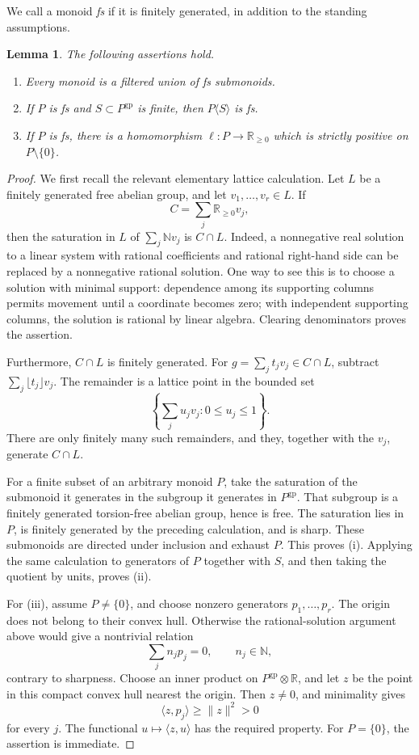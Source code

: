 \documentclass[11pt]{article}
\newtheorem{lemma}[theorem]{Lemma}
\theoremstyle{definition}
\theoremstyle{remark}
\newcommand{\gp}{\mathrm{gp}}
\newcommand{\NN}{\mathbb N}
\newcommand{\RR}{\mathbb R}
\begin{document}
We call a monoid \emph{fs} if it is finitely generated, in addition
to the standing assumptions.

\begin{lemma}\label{lem:fs}
The following assertions hold.
\begin{enumerate}[label=\textup{(\roman*)}]
\item Every monoid is a filtered union of fs submonoids.
\item If \(P\) is fs and \(S\subset P^{\gp}\) is finite, then
\(P\langle S\rangle\) is fs.
\item If \(P\) is fs, there is a homomorphism
\(\ell:P\to\RR_{\ge0}\) which is strictly positive on
\(P\setminus\{0\}\).
\end{enumerate}
\end{lemma}

\begin{proof}
We first recall the relevant elementary lattice calculation.
Let \(L\) be a finitely generated free abelian group, and let
\(v_1,\ldots,v_r\in L\). If
\[
C=\sum_j\RR_{\ge0}v_j,
\]
then the saturation in \(L\) of \(\sum_j\NN v_j\) is \(C\cap L\).
Indeed, a nonnegative real solution to a linear system with rational
coefficients and rational right-hand side can be replaced by a
nonnegative rational solution. One way to see this is to choose a
solution with minimal support: dependence among its supporting
columns permits movement until a coordinate becomes zero; with
independent supporting columns, the solution is rational by linear
algebra. Clearing denominators proves the assertion.

Furthermore, \(C\cap L\) is finitely generated. For
\(g=\sum_j t_jv_j\in C\cap L\), subtract
\(\sum_j\lfloor t_j\rfloor v_j\). The remainder is a lattice point in
the bounded set
\[
\left\{\sum_j u_jv_j:0\le u_j\le1\right\}.
\]
There are only finitely many such remainders, and they, together
with the \(v_j\), generate \(C\cap L\).

For a finite subset of an arbitrary monoid \(P\), take the
saturation of the submonoid it generates in the subgroup it
generates in \(P^{\gp}\). That subgroup is a finitely generated
torsion-free abelian group, hence is free. The saturation lies in
\(P\), is finitely generated by the preceding calculation, and is
sharp. These submonoids are directed under inclusion and exhaust
\(P\). This proves (i). Applying the same calculation to generators
of \(P\) together with \(S\), and then taking the quotient by units,
proves (ii).

For (iii), assume \(P\ne\{0\}\), and choose nonzero generators
\(p_1,\ldots,p_r\). The origin does not belong to their convex hull.
Otherwise the rational-solution argument above would give a
nontrivial relation
\[
\sum_j n_jp_j=0,\qquad n_j\in\NN,
\]
contrary to sharpness. Choose an inner product on
\(P^{\gp}\otimes\RR\), and let \(z\) be the point in this compact
convex hull nearest the origin. Then \(z\ne0\), and minimality gives
\[
\langle z,p_j\rangle\ge \lVert z\rVert^2>0
\]
for every \(j\). The functional \(u\mapsto\langle z,u\rangle\)
has the required property. For \(P=\{0\}\), the assertion is
immediate.
\end{proof}
\end{document}
